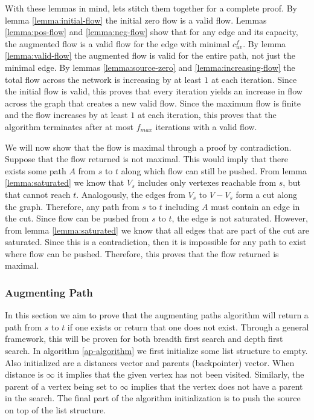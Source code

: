 \documentclass{article}
\begin{document}
With these lemmas in mind, lets stitch them together for a complete proof. By lemma \ref{lemma:initial-flow} the initial zero flow is a valid flow. Lemmas \ref{lemma:pos-flow} and \ref{lemma:neg-flow} show that for any edge and its capacity, the augmented flow is a valid flow for the edge with minimal $c_{uv}^f$. By lemma \ref{lemma:valid-flow} the augmented flow is valid for the entire path, not just the minimal edge. By lemmas \ref{lemma:source-zero} and \ref{lemma:increasing-flow} the total flow across the network is increasing by at least $1$ at each iteration. Since the initial flow is valid, this proves that every iteration yields an increase in flow across the graph that creates a new valid flow. Since the maximum flow is finite and the flow increases by at least $1$ at each iteration, this proves that the algorithm terminates after at most $f_{max}$ iterations with a valid flow.

We will now show that the flow is maximal through a proof by contradiction. Suppose that the flow returned is not maximal. This would imply that there exists some path $A$ from $s$ to $t$ along which flow can still be pushed. From lemma \ref{lemma:saturated} we know that $V_s$ includes only vertexes reachable from $s$, but that cannot reach $t$. Analogously, the edges from $V_s$ to $V-V_s$ form a cut along the graph. Therefore, any path from $s$ to $t$ including $A$ must contain an edge in the cut. Since flow can be pushed from $s$ to $t$, the edge is not saturated. However, from lemma \ref{lemma:saturated} we know that all edges that are part of the cut are saturated. Since this is a contradiction, then it is impossible for any path to exist where flow can be pushed. Therefore, this proves that the flow returned is maximal.

\subsubsection{Augmenting Path}
In this section we aim to prove that the augmenting paths algorithm will return a path from $s$ to $t$ if one exists or return that one does not exist. Through a general framework, this will be proven for both breadth first search and depth first search. In algorithm \ref{ap-algorithm} we first initialize some list structure to empty. Also initialized are a distances vector and parents (backpointer) vector. When distance is $\infty$ it implies that the given vertex has not been visited. Similarly, the parent of a vertex being set to $\infty$ implies that the vertex does not have a parent in the search. The final part of the algorithm initialization is to push the source on top of the list structure.
\end{document}

